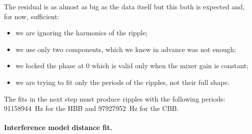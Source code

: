 The residual is as almost as big as the data itself but this both is expected and, for now, sufficient:
\begin{itemize}
    \item we are ignoring the harmonics of the ripple;
    \item we use only two components, which we knew in advance was not enough;
    \item we locked the phase at 0 which is valid only when the mixer gain is constant;
    \item we are trying to fit only the periods of the ripples, not their full shape.
\end{itemize}

The fits in the next step must produce ripples with the following periods:
\SI{91158944}{\hertz} for the HBB and \SI{97927952}{\hertz} for the CBB.

\paragraph{Interference model distance fit.}


